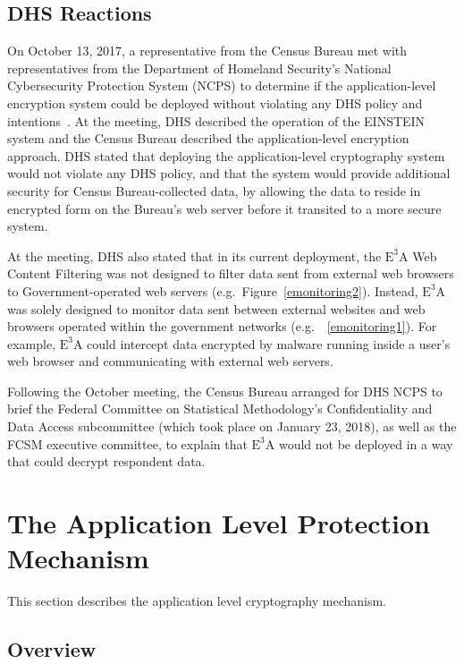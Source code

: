 \documentclass[fleqn,10pt]{wlscirep}
\newcommand{\ETA}{$\textrm{E}^\textrm{3}\textrm{A}$\xspace}
\begin{document}
\subsection{DHS Reactions}

On October 13, 2017, a representative from the Census Bureau met with
representatives from the Department of Homeland Security's National
Cybersecurity Protection System (NCPS) to determine if the
application-level encryption system could be deployed without
violating any DHS policy and intentions~\cite{garfinkel-notes}. At the meeting, DHS
described the operation of the EINSTEIN system and the Census Bureau
described the application-level encryption approach. DHS stated that
deploying the application-level cryptography system would not violate
any DHS policy, and that the system
would provide additional security for Census Bureau-collected data, by
allowing the data to reside in encrypted form on the Bureau's web
server before it transited to a more secure system.

At the meeting, DHS also stated that in its current deployment, the \ETA Web Content Filtering
was not designed to filter data sent from external web browsers to
Government-operated web servers (e.g.~Figure~\ref{emonitoring2}). Instead, \ETA was solely designed to
monitor data sent between external websites and web browsers operated
within the government networks (e.g.~\Figure~\ref{emonitoring1}). For example, \ETA could intercept data
encrypted by malware running inside a user's web browser and
communicating with external web servers.

Following the October meeting, the Census Bureau arranged for DHS NCPS
to brief the Federal Committee on Statistical Methodology's
Confidentiality and Data Access subcommittee (which took place on
January 23, 2018), as well as the FCSM executive committee, to explain
that \ETA would not be deployed in a way that could decrypt respondent data.

\section{The Application Level Protection Mechanism}

This section describes the application level cryptography mechanism.

\subsection{Overview}
\end{document}
